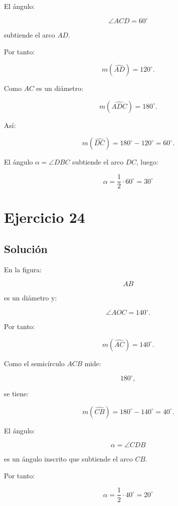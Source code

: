 \documentclass[11pt,a4paper]{article}
\begin{document}
El ángulo:

\[
\angle ACD=60^\circ
\]

subtiende el arco \(AD\).

Por tanto:

\[
m(\widehat{AD})=120^\circ.
\]

Como \(AC\) es un diámetro:

\[
m(\widehat{ADC})=180^\circ.
\]

Así:

\[
m(\widehat{DC})
=
180^\circ-120^\circ
=
60^\circ.
\]

El ángulo \(\alpha=\angle DBC\) subtiende el arco \(DC\), luego:

\[
\boxed{
\alpha
=
\frac12\cdot60^\circ
=
30^\circ
}
\]

\section{Ejercicio 24}
\subsection{Solución}

En la figura:

\[
AB
\]

es un diámetro y:

\[
\angle AOC=140^\circ.
\]

Por tanto:

\[
m(\widehat{AC})=140^\circ.
\]

Como el semicírculo \(ACB\) mide:

\[
180^\circ,
\]

se tiene:

\[
m(\widehat{CB})
=
180^\circ-140^\circ
=
40^\circ.
\]

El ángulo:

\[
\alpha=\angle CDB
\]

es un ángulo inscrito que subtiende el arco \(CB\).

Por tanto:

\[
\boxed{
\alpha
=
\frac12\cdot40^\circ
=
20^\circ
}
\]
\end{document}
